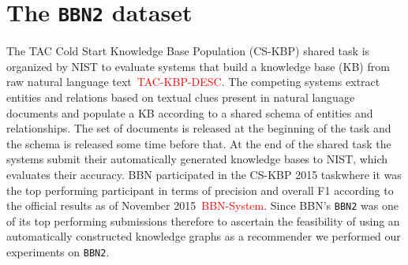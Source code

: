 \documentclass[paper=a4,fontsize=11pt]{scrartcl}
\numberwithin{equation}{section}    %
\numberwithin{figure}{section}      %
\numberwithin{table}{section}       %
\renewcommand{\cite}[1]{\textcolor{red}{#1}}
\newcommand{\dataset}[0]{\texttt{BBN2} dataset}
\newcommand{\task}{CS-KBP 2015 task\xspace{}}
\begin{document}
\section{The \dataset{}}
\label{sec:data}
The TAC Cold Start Knowledge Base Population (CS-KBP) shared task is organized
by NIST to evaluate systems that build a knowledge base (KB) from raw natural
language text~\cite{TAC-KBP-DESC}.  The competing systems extract entities and relations based on
textual clues present in natural language documents and populate a KB according to a shared
schema of entities and relationships. The set of documents is released at the beginning of
the task and the schema is released some time before that.
At the end of the shared task the systems submit their
automatically generated knowledge bases to NIST, which evaluates their accuracy.
BBN participated in the \task where it was the top performing
participant in terms of precision and overall F1 according to the official
results as of November 2015~\cite{BBN-System}. Since BBN's \texttt{BBN2} was one
of its top performing submissions therefore to ascertain the feasibility of using an
automatically constructed knowledge graphs as a recommender we
performed our experiments on \texttt{BBN2}.
\end{document}
